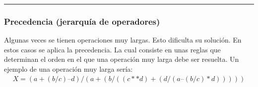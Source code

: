 \documentclass[letterpaper,10pt,spanish]{sphinxmanual}
\begin{document}
\bigskip\hrule\bigskip



\subsubsection{Precedencia (jerarquía de operadores)}
\label{\detokenize{1_guias/10programacion/G1025:precedencia-jerarquia-de-operadores}}
\sphinxAtStartPar
Algunas veces se tienen operaciones muy largas. Esto dificulta su solución. En estos casos se aplica la precedencia. La cual consiste en unas reglas que determinan el orden en el que una operación muy larga debe ser resuelta. Un ejemplo de una operación muy larga sería:
\begin{equation*}
\begin{split}
X = ( a + (b / c) – d ) / ( a + ( b / ( (c ** d) + (d / ( a – (b / c) * d ) ) ) ) )
\end{split}
\end{equation*}
\end{document}
